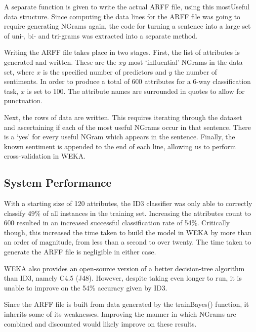 \documentclass[a4paper,oneside]{article}
\begin{document}
A separate function is given to write the actual ARFF file, using this
mostUseful data structure. Since computing the data lines for the ARFF file was
going to require generating NGrams again, the code for turning a sentence into
a large set of uni-, bi- and tri-grams was extracted into a separate method.

Writing the ARFF file takes place in two stages.  First, the list of attributes
is generated and written.  These are the $xy$ most `influential' NGrams in the
data set, where $x$ is the specified number of predictors and $y$ the number of
sentiments. In order to produce a total of 600 attributes for a 6-way
classification task, $x$ is set to 100. The attribute names are surrounded in
quotes to allow for punctuation.

Next, the rows of data are written. This requires iterating through the dataset
and ascertaining if each of the most useful NGrams occur in that sentence.
There is a `yes' for every useful NGram which appears in the sentence. Finally,
the known sentiment is appended to the end of each line, allowing us to perform
cross-validation in WEKA.

\subsection{System Performance}

With a starting size of 120 attributes, the ID3 classifier was only able to
correctly classify 49\% of all instances in the training set. Increasing the
attributes count to 600 resulted in an increased successful classification rate
of 54\%.  Critically though, this increased the time taken to build the model
in WEKA by more than an order of magnitude, from less than a second to over
twenty. The time taken to generate the ARFF file is negligible in either case.

WEKA also provides an open-source version of a better decision-tree algorithm
than ID3, namely C4.5 (J48). However, despite taking even longer to run, it is
unable to improve on the 54\% accuracy given by ID3.

Since the ARFF file is built from data generated by the trainBayes() function,
it inherits some of its weaknesses. Improving the manner in which NGrams are
combined and discounted would likely improve on these results.
\end{document}
